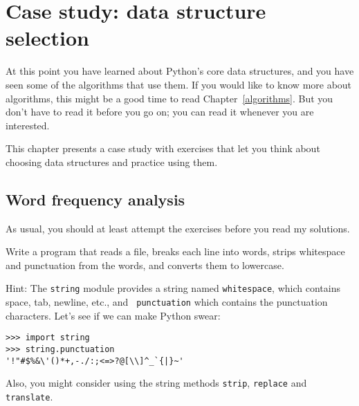 \documentclass[10pt]{book}
\begin{document}




\chapter{Case study: data structure selection}

At this point you have learned about Python's core data structures,
and you have seen some of the algorithms that use them.
If you would like to know more about algorithms, this might be a good
time to read Chapter~\ref{algorithms}.
But you don't have to read it before you go on; you can read
it whenever you are interested.

This chapter presents a case study with exercises that let
you think about choosing data structures and practice using them.


\section{Word frequency analysis}
\label{analysis}

As usual, you should at least attempt the exercises
before you read my solutions.

\begin{exercise}

Write a program that reads a file, breaks each line into
words, strips whitespace and punctuation from the words, and
converts them to lowercase.

Hint: The {\tt string} module provides a string named {\tt whitespace},
which contains space, tab, newline, etc., and {\tt
  punctuation} which contains the punctuation characters.  Let's see
if we can make Python swear:

\begin{verbatim}
>>> import string
>>> string.punctuation
'!"#$%&\'()*+,-./:;<=>?@[\\]^_`{|}~'
\end{verbatim}
%
Also, you might consider using the string methods {\tt strip},
{\tt replace} and {\tt translate}.

\end{exercise}
\end{document}
